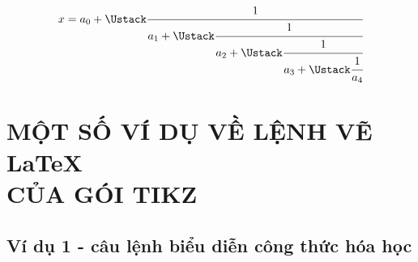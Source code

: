 \begin{equation}
x = a_0 + \cfrac{1}{a_1
	+ \cfrac{1}{a_2
		+ \cfrac{1}{a_3 + \cfrac{1}{a_4} } } }
\end{equation}

\newpage
\chapter[MỘT SỐ VÍ DỤ VỀ LỆNH VẼ  \LaTeX CỦA GÓI TIKZ]{MỘT SỐ VÍ DỤ VỀ LỆNH VẼ \LaTeX \\ CỦA GÓI TIKZ}


\section{Ví dụ 1 - câu lệnh biểu diễn công thức hóa học}
\ttfamily
\footnotesize


